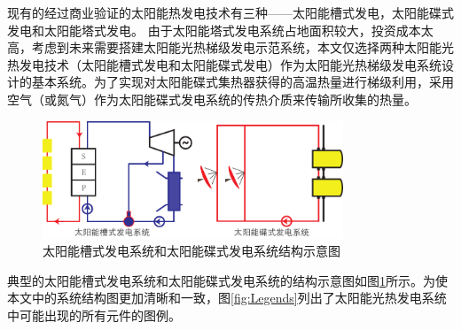 现有的经过商业验证的太阳能热发电技术有三种——太阳能槽式发电，太阳能碟式发电和太阳能塔式发电。
由于太阳能塔式发电系统占地面积较大，投资成本太高，考虑到未来需要搭建太阳能光热梯级发电示范系统，本文仅选择两种太阳能光热发电技术（太阳能槽式发电和太阳能碟式发电）作为太阳能光热梯级发电系统设计的基本系统。为了实现对太阳能碟式集热器获得的高温热量进行梯级利用，采用空气（或氮气）作为太阳能碟式发电系统的传热介质来传输所收集的热量。
\begin{figure}[!ht]
\centering
\includegraphics[width=0.8\textwidth]{fig/PTPD.pdf}
\caption{太阳能槽式发电系统和太阳能碟式发电系统结构示意图}
\label{fig:PTPD}
\end{figure}
典型的太阳能槽式发电系统和太阳能碟式发电系统的结构示意图如图\ref{fig:PTPD}所示。为使本文中的系统结构图更加清晰和一致，图\ref{fig:Legends}列出了太阳能光热发电系统中可能出现的所有元件的图例。
